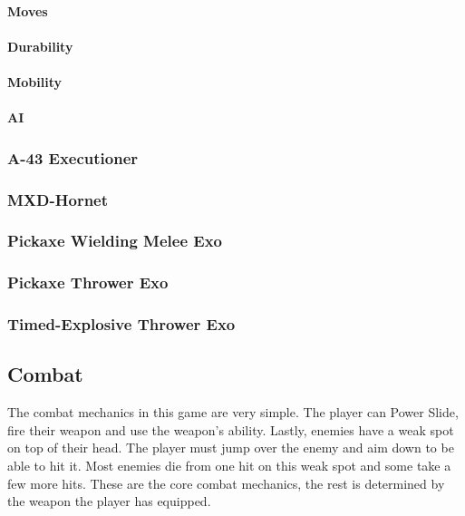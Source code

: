\documentclass[12pt]{article}
\begin{document}
\paragraph{Moves}

\paragraph{Durability}

\paragraph{Mobility}

\paragraph{AI}

\subsubsection{A-43 Executioner}

\subsubsection{MXD-Hornet}

\subsubsection{Pickaxe Wielding Melee Exo}

\subsubsection{Pickaxe Thrower Exo}

\subsubsection{Timed-Explosive Thrower Exo}

\subsection{Combat}

The combat mechanics in this game are very simple. The player can Power Slide, fire their weapon and use the weapon's ability. Lastly, enemies have a weak spot on top of their head. The player must jump over the enemy and aim down to be able to hit it. Most enemies die from one hit on this weak spot and some take a few more hits. 
These are the core combat mechanics, the rest is determined by the weapon the player has equipped.
\end{document}
